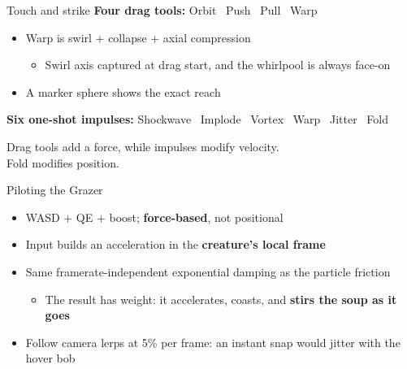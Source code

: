 \documentclass[10pt]{beamer}
\begin{document}
\begin{frame}{Touch and strike}
	\textbf{Four drag tools:} Orbit \textbullet\ Push \textbullet\ Pull \textbullet\ Warp
	\begin{itemize}
		\item Warp is swirl + collapse + axial compression
		      \begin{itemize}
			      \item Swirl axis captured at drag start, and the whirlpool is always face-on
		      \end{itemize}
		\item A marker sphere shows the exact reach
	\end{itemize}
	\vspace{1ex}
	\textbf{Six one-shot impulses:} Shockwave \textbullet\ Implode \textbullet\ Vortex \textbullet\ Warp \textbullet\ Jitter \textbullet\ Fold
	\begin{block}{}
		\centering Drag tools add a force, while impulses modify velocity. \\
		Fold modifies position.
	\end{block}
\end{frame}

\begin{frame}{Piloting the Grazer}
	\begin{itemize}
		\item WASD + QE + boost; \textbf{force-based}, not positional
		\item Input builds an acceleration in the \textbf{creature's local frame}
		\item Same framerate-independent exponential damping as the particle friction
		      \begin{itemize}
			      \item The result has weight: it accelerates, coasts, and \textbf{stirs the soup as it goes}
		      \end{itemize}
		\item Follow camera lerps at 5\% per frame: an instant snap would jitter with the hover bob
	\end{itemize}
\end{frame}
\end{document}
